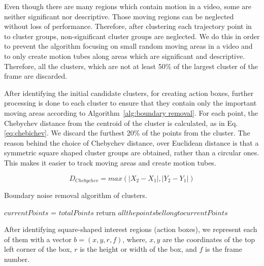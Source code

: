 Even though there are many regions which contain motion in a video, some are neither significant nor descriptive.
Those moving regions can be neglected without loss of performance. Therefore, after clustering each trajectory point in to cluster groups,
non-significant cluster groups are neglected.
We do this in order to prevent the algorithm focusing on small random moving areas in a video and to only create motion tubes along areas which are significant and descriptive.
Therefore, all the clusters, which are not at least 50\% of the largest cluster of the frame are discarded.

After identifying the initial candidate clusters, for creating action boxes, further processing is done to each cluster to ensure that they
contain only the important moving areas according to Algorithm~\ref{alg:boundary removal}. For each point, the Chebychev distance from the centroid of the cluster is calculated,
as in
Eq. \ref{eq:chebichev}. We discard the furthest 20\% of the points from the cluster. The reason behind the choice of Chebychev
distance, over Euclidean distance is that a symmetric square shaped cluster groups are obtained, rather than a circular ones. This makes it
easier to track moving areas and create motion tubes.

\begin{equation}\label{eq:chebichev}
 D_{Chebychev} = max(|X_{2} - X_{1}|,|Y_{2}-Y_{1}|)
\end{equation}

\begin{algorithm*}
   \caption{Boundary noise removal algorithm of clusters.}
   \label{alg:boundary removal}
    \begin{algorithmic}[1]
	\State $currentPoints$ = $totalPoints$
	    \State return $all the points bellong to currentPoints$
	  \EndIf
	
	\EndWhile
     \EndFunction


\end{algorithmic}
\end{algorithm*}

After identifying square-shaped interest regions (action boxes), we represent each of them with a vector $b = (x,y,r,f)$, where, $x,y$ are the coordinates
of the top left corner of the box, $r$ is the height or width of the box, and $f$ is the frame number.


